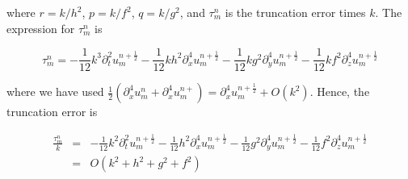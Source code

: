 where $r = k/h^2$, $p = k/f^2$, $q = k/g^2$, and $\tau_m^n$ is the truncation error times $k$. The expression for $\tau_m^n$ is

\begin{equation*}
\tau_m^n = -\frac{1}{12} k^3 \partial_t^2 u_m^{n+\frac{1}{2}} - \frac{1}{12} k h^2 \partial_x^4 u_m^{n+\frac{1}{2}} - \frac{1}{12} k g^2 \partial_y^4 u_m^{n+\frac{1}{2}} - \frac{1}{12} k f^2 \partial_z^4 u_m^{n+\frac{1}{2}}
\end{equation*}

where we have used $\frac{1}{2}(\partial_x^4 u_m^n + \partial_x^4 u_m^{n+}) = \partial_x^4 u_m^{n+\frac{1}{2}} + O(k^2)$. Hence, the truncation error is 

\begin{eqnarray*}
\frac{\tau_m^ n}{k} &=& -\frac{1}{12} k^2 \partial_t^2 u_m^{n+\frac{1}{2}} - \frac{1}{12} h^2 \partial_x^4 u_m^{n+\frac{1}{2}} - \frac{1}{12} g^2 \partial_y^4 u_m^{n+\frac{1}{2}} - \frac{1}{12} f^2 \partial_z^4 u_m^{n+\frac{1}{2}}\\
					&=& O(k^2 + h^2 + g^2 + f^2)
\end{eqnarray*}